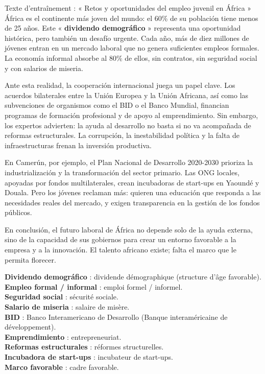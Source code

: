 \documentclass[11pt]{article}
\begin{document}
\begin{textebox}{Texte d'entraînement : « Retos y oportunidades del empleo juvenil en África »}
África es el continente más joven del mundo: el 60\% de su población tiene menos de 25 años. Este « \textbf{dividendo demográfico} » representa una oportunidad histórica, pero también un desafío urgente. Cada año, más de diez millones de jóvenes entran en un mercado laboral que no genera suficientes empleos formales. La economía informal absorbe al 80\% de ellos, sin contratos, sin seguridad social y con salarios de miseria.

Ante esta realidad, la cooperación internacional juega un papel clave. Los acuerdos bilaterales entre la Unión Europea y la Unión Africana, así como las subvenciones de organismos como el BID o el Banco Mundial, financian programas de formación profesional y de apoyo al emprendimiento. Sin embargo, los expertos advierten: la ayuda al desarrollo no basta si no va acompañada de reformas estructurales. La corrupción, la inestabilidad política y la falta de infraestructuras frenan la inversión productiva.

En Camerún, por ejemplo, el Plan Nacional de Desarrollo 2020-2030 prioriza la industrialización y la transformación del sector primario. Las ONG locales, apoyadas por fondos multilaterales, crean incubadoras de start-ups en Yaoundé y Douala. Pero los jóvenes reclaman más: quieren una educación que responda a las necesidades reales del mercado, y exigen transparencia en la gestión de los fondos públicos.

En conclusión, el futuro laboral de África no depende solo de la ayuda externa, sino de la capacidad de sus gobiernos para crear un entorno favorable a la empresa y a la innovación. El talento africano existe; falta el marco que le permita florecer.
\end{textebox}

\begin{definition}
\textbf{Dividendo demográfico} : dividende démographique (structure d'âge favorable). \\
\textbf{Empleo formal / informal} : emploi formel / informel. \\
\textbf{Seguridad social} : sécurité sociale. \\
\textbf{Salario de miseria} : salaire de misère. \\
\textbf{BID} : Banco Interamericano de Desarrollo (Banque interaméricaine de développement). \\
\textbf{Emprendimiento} : entrepreneuriat. \\
\textbf{Reformas estructurales} : réformes structurelles. \\
\textbf{Incubadora de start-ups} : incubateur de start-ups. \\
\textbf{Marco favorable} : cadre favorable.
\end{definition}
\end{document}
